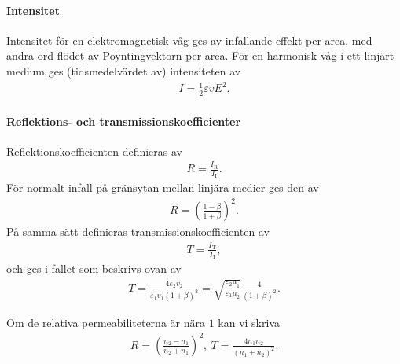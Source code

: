 \paragraph{Intensitet}
Intensitet för en elektromagnetisk våg ges av infallande effekt per area, med andra ord flödet av Poyntingvektorn per area. För en harmonisk våg i ett linjärt medium ges (tidsmedelvärdet av) intensiteten av
\begin{align*}
	I = \frac{1}{2}\varepsilon vE^{2}.
\end{align*}

\paragraph{Reflektions- och transmissionskoefficienter}
Reflektionskoefficienten definieras av
\begin{align*}
	R = \frac{I_{\text{R}}}{I_{\text{I}}}.
\end{align*}
För normalt infall på gränsytan mellan linjära medier ges den av
\begin{align*}
	R = \left(\frac{1 - \beta}{1 + \beta}\right)^{2}.
\end{align*}
På samma sätt definieras transmissionskoefficienten av
\begin{align*}
	T = \frac{I_{\text{T}}}{I_{\text{I}}},
\end{align*}
och ges i fallet som beskrivs ovan av
\begin{align*}
	T = \frac{4\varepsilon_{2}v_{2}}{\varepsilon_{1}v_{1}(1 + \beta)^{2}} = \sqrt{\frac{\varepsilon_{2}\mu_{1}}{\varepsilon_{1}\mu_{2}}}\frac{4}{(1 + \beta)^{2}}.
\end{align*}

Om de relativa permeabiliteterna är nära $1$ kan vi skriva
\begin{align*}
	R = \left(\frac{n_{2} - n_{1}}{n_{2} + n_{1}}\right)^{2},\ T = \frac{4n_{1}n_{2}}{(n_{1} + n_{2})^{2}}.
\end{align*}


